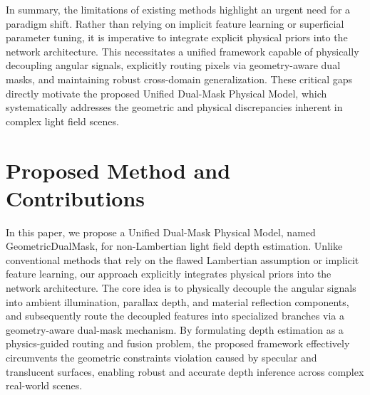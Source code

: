 \documentclass[lettersize,journal]{IEEEtran}
\begin{document}
\begin{table}[!t]
\centering
\caption{Summary of Limitations in Existing Light Field Depth Estimation Methods}
\label{tab:limitations_summary}
\end{table}

In summary, the limitations of existing methods highlight an urgent need for a paradigm shift. Rather than relying on implicit feature learning or superficial parameter tuning, it is imperative to integrate explicit physical priors into the network architecture. This necessitates a unified framework capable of physically decoupling angular signals, explicitly routing pixels via geometry-aware dual masks, and maintaining robust cross-domain generalization. These critical gaps directly motivate the proposed Unified Dual-Mask Physical Model, which systematically addresses the geometric and physical discrepancies inherent in complex light field scenes.

\section{Proposed Method and Contributions}

In this paper, we propose a Unified Dual-Mask Physical Model, named GeometricDualMask, for non-Lambertian light field depth estimation. Unlike conventional methods that rely on the flawed Lambertian assumption or implicit feature learning, our approach explicitly integrates physical priors into the network architecture. The core idea is to physically decouple the angular signals into ambient illumination, parallax depth, and material reflection components, and subsequently route the decoupled features into specialized branches via a geometry-aware dual-mask mechanism. By formulating depth estimation as a physics-guided routing and fusion problem, the proposed framework effectively circumvents the geometric constraints violation caused by specular and translucent surfaces, enabling robust and accurate depth inference across complex real-world scenes.
\end{document}
